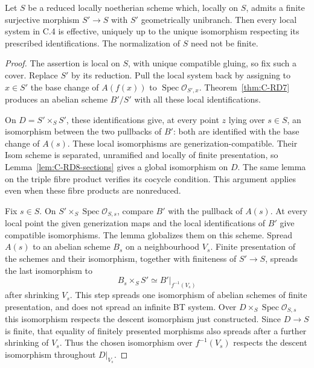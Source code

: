 \begin{theorem}
\label{thm:C-RD8}
Let $S$ be a reduced locally noetherian scheme which, locally on $S$,
admits a finite surjective morphism $S'\to S$ with $S'$ geometrically
unibranch. Then every local system in C.4 is effective, uniquely up to
the unique isomorphism respecting its prescribed identifications.
The normalization of $S$ need not be finite.
\end{theorem}
\begin{proof}
The assertion is local on $S$, with unique compatible gluing, so fix
such a cover. Replace $S'$ by its reduction. Pull the local system
back by assigning to $x\in S'$ the base change of $A(f(x))$ to
$\operatorname{Spec}\mathcal O_{S',x}$. Theorem~\ref{thm:C-RD7}
produces an abelian scheme $B'/S'$ with all these local identifications.

On $D=S'\times_SS'$, these identifications give, at every point $z$
lying over $s\in S$, an isomorphism between the two pullbacks of $B'$:
both are identified with the base change of $A(s)$. These local
isomorphisms are generization-compatible. Their Isom scheme is
separated, unramified and locally of finite presentation, so
Lemma~\ref{lem:C-RD8-sections} gives a global isomorphism on $D$.
The same lemma on the triple fibre product verifies its cocycle
condition. This argument applies even when these fibre products are
nonreduced.

Fix $s\in S$. On $S'\times_S\operatorname{Spec}\mathcal O_{S,s}$,
compare $B'$ with the pullback of $A(s)$. At every local point the
given generization maps and the local identifications of $B'$ give
compatible isomorphisms. The lemma globalizes them on this scheme.
Spread $A(s)$ to an abelian scheme $B_s$ on a neighbourhood $V_s$.
Finite presentation of the schemes and their isomorphism, together
with finiteness of $S'\to S$, spreads the last isomorphism to
\[
 B_s\times_S S'\simeq B'|_{f^{-1}(V_s)}
\]
after shrinking $V_s$. This step spreads one isomorphism of abelian
schemes of finite presentation, and does not spread an infinite BT
system. Over $D\times_S\operatorname{Spec}\mathcal O_{S,s}$ this
isomorphism respects the descent isomorphism just constructed. Since
$D\to S$ is finite, that equality of finitely presented morphisms
also spreads after a further shrinking of $V_s$. Thus the chosen
isomorphism over $f^{-1}(V_s)$ respects the descent isomorphism
throughout $D|_{V_s}$.


\end{proof}
